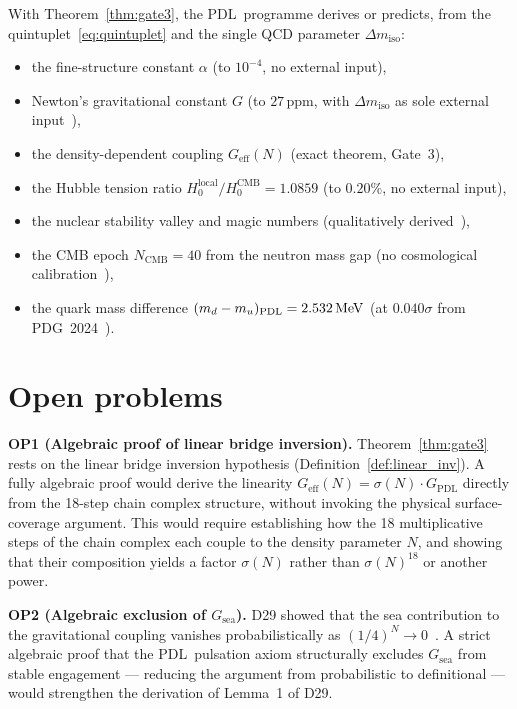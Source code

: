 \documentclass[11pt,a4paper]{article}
\theoremstyle{definition}
\newcommand{\PDL}{\textnormal{PDL}}
\newcommand{\dmiso}{\Delta m_{\mathrm{iso}}}
\newcommand{\GPDL}{G_{\mathrm{PDL}}}
\newcommand{\Geff}{G_{\mathrm{eff}}}
\newcommand{\sig}{\sigma}
\newcommand{\Ncmb}{N_{\mathrm{CMB}}}
\begin{document}
With Theorem~\ref{thm:gate3}, the \PDL\ programme derives or predicts, from the quintuplet~\eqref{eq:quintuplet} and the single QCD parameter $\dmiso$:
\begin{itemize}
\item the fine-structure constant $\alpha$ (to $10^{-4}$, no external input),
\item Newton's gravitational constant $G$ (to $27\,\mathrm{ppm}$, with $\dmiso$ as sole external input~\cite{PDL_D30_2026}),
\item the density-dependent coupling $\Geff(N)$ (exact theorem, Gate~3),
\item the Hubble tension ratio $H_0^{\mathrm{local}}/H_0^{\mathrm{CMB}} = 1.0859$ (to $0.20\%$, no external input),
\item the nuclear stability valley and magic numbers (qualitatively derived~\cite{Nuclear_Stability_PDL_2026}),
\item the CMB epoch $\Ncmb = 40$ from the neutron mass gap (no cosmological calibration~\cite{NCMB_PDL_2026}),
\item the quark mass difference $(m_d-m_u)_{\PDL} = 2.532\,\mathrm{MeV}$ (at $0.040\sigma$ from PDG~2024~\cite{PDL_D28_2026}).
\end{itemize}

\section{Open problems}
\label{sec:open}

\medskip\noindent\textbf{OP1 (Algebraic proof of linear bridge inversion).} Theorem~\ref{thm:gate3} rests on the linear bridge inversion hypothesis (Definition~\ref{def:linear_inv}). A fully algebraic proof would derive the linearity $\Geff(N) = \sig(N)\cdot\GPDL$ directly from the 18-step chain complex structure, without invoking the physical surface-coverage argument. This would require establishing how the 18 multiplicative steps of the chain complex each couple to the density parameter $N$, and showing that their composition yields a factor $\sig(N)$ rather than $\sig(N)^{18}$ or another power.

\medskip\noindent\textbf{OP2 (Algebraic exclusion of $G_{\mathrm{sea}}$).} D29 showed that the sea contribution to the gravitational coupling vanishes probabilistically as $(1/4)^N \to 0$~\cite{PDL_D29_2026}. A strict algebraic proof that the \PDL\ pulsation axiom structurally excludes $G_{\mathrm{sea}}$ from stable engagement --- reducing the argument from probabilistic to definitional --- would strengthen the derivation of Lemma~1 of D29.
\end{document}
